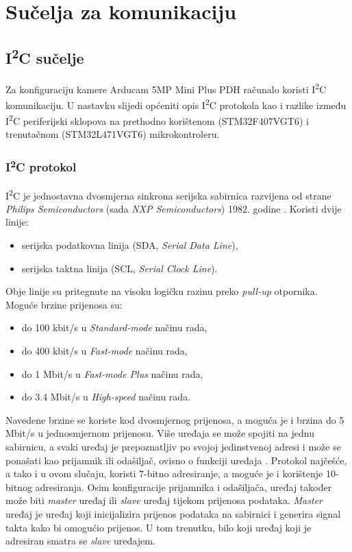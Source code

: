 \chapter{Sučelja za komunikaciju}

\section{I\textsuperscript{2}C sučelje}

Za konfiguraciju kamere Arducam 5MP Mini Plus  PDH računalo koristi I\textsuperscript{2}C komunikaciju. U nastavku slijedi općeniti opis I\textsuperscript{2}C protokola kao i razlike između I\textsuperscript{2}C periferijski sklopova na prethodno korištenom (STM32F407VGT6) i trenutačnom (STM32L471VGT6) mikrokontroleru.

\subsection{I\textsuperscript{2}C protokol}

I\textsuperscript{2}C je jednostavna dvosmjerna sinkrona serijska sabirnica razvijena od strane \textit{Philips Semiconductors} (sada \textit{NXP Semiconductors}) 1982. godine \cite{i2c_wikipedia}. Koristi dvije linije:
\begin{itemize}
	\item serijska podatkovna linija (SDA, \textit{Serial Data Line}),
	\item serijska taktna linija (SCL, \textit{Serial Clock Line}).
\end{itemize}
Obje linije su pritegnute na visoku logičku razinu preko \textit{pull-up} otpornika. Moguće brzine prijenosa su:
\begin{itemize}
	\item do 100 kbit/s u \textit{Standard-mode} načinu rada, 
	\item do 400 kbit/s u \textit{Fast-mode} načinu rada,
	\item do 1 Mbit/s u \textit{Fast-mode Plus} načinu rada,
	\item do 3.4 Mbit/s u \textit{High-speed} načinu rada.
\end{itemize}
Navedene brzine se koriste kod dvosmjernog prijenosa, a moguća je i brzina do 5 Mbit/s u jednosmjernom prijenosu. Više uređaja se može spojiti na jednu sabirnicu, a svaki uređaj je prepoznatljiv po svojoj jedinstvenoj adresi i može se ponašati kao prijamnik ili odašiljač, ovisno o funkciji uređaja \cite{i2c_manual}. Protokol najčešće, a tako i u ovom slučaju, koristi 7-bitno adresiranje, a moguće je i korištenje 10-bitnog adresiranja. Osim konfiguracije prijamnika i odašiljača, uređaj također može biti \textit{master} uređaj ili \textit{slave} uređaj tijekom prijenosa podataka. \textit{Master} uređaj je uređaj koji inicijalizira prijenos podataka na sabirnici i generira signal takta kako bi omogućio prijenos. U tom trenutku, bilo koji uređaj koji je adresiran smatra se \textit{slave} uređajem.

